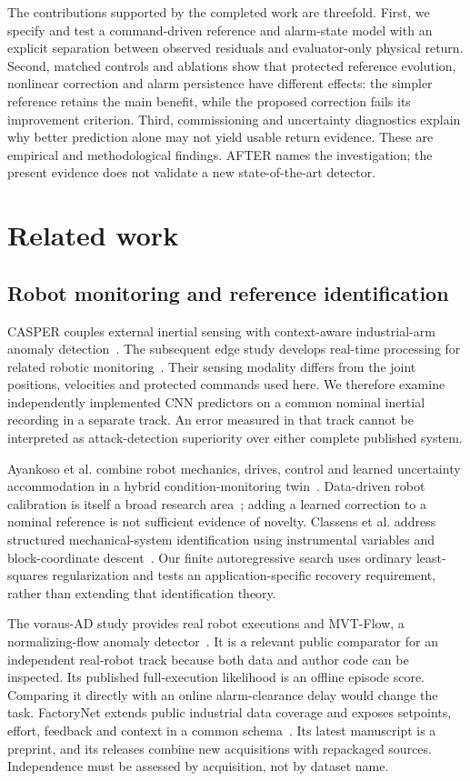 \documentclass[11pt]{article}
\begin{document}
The contributions supported by the completed work are threefold. First, we specify and test a command-driven reference and alarm-state model with an explicit separation between observed residuals and evaluator-only physical return. Second, matched controls and ablations show that protected reference evolution, nonlinear correction and alarm persistence have different effects: the simpler reference retains the main benefit, while the proposed correction fails its improvement criterion. Third, commissioning and uncertainty diagnostics explain why better prediction alone may not yield usable return evidence. These are empirical and methodological findings. AFTER names the investigation; the present evidence does not validate a new state-of-the-art detector.

\section{Related work}
\subsection{Robot monitoring and reference identification}
CASPER couples external inertial sensing with context-aware industrial-arm anomaly detection~\cite{casper}. The subsequent edge study develops real-time processing for related robotic monitoring~\cite{edge}. Their sensing modality differs from the joint positions, velocities and protected commands used here. We therefore examine independently implemented CNN predictors on a common nominal inertial recording in a separate track. An error measured in that track cannot be interpreted as attack-detection superiority over either complete published system.

Ayankoso et al. combine robot mechanics, drives, control and learned uncertainty accommodation in a hybrid condition-monitoring twin~\cite{hybrid}. Data-driven robot calibration is itself a broad research area~\cite{calibration}; adding a learned correction to a nominal reference is not sufficient evidence of novelty. Classens et al. address structured mechanical-system identification using instrumental variables and block-coordinate descent~\cite{identification}. Our finite autoregressive search uses ordinary least-squares regularization and tests an application-specific recovery requirement, rather than extending that identification theory.

The voraus-AD study provides real robot executions and MVT-Flow, a normalizing-flow anomaly detector~\cite{voraus}. It is a relevant public comparator for an independent real-robot track because both data and author code can be inspected. Its published full-execution likelihood is an offline episode score. Comparing it directly with an online alarm-clearance delay would change the task. FactoryNet extends public industrial data coverage and exposes setpoints, effort, feedback and context in a common schema~\cite{factory}. Its latest manuscript is a preprint, and its releases combine new acquisitions with repackaged sources. Independence must be assessed by acquisition, not by dataset name.
\end{document}
